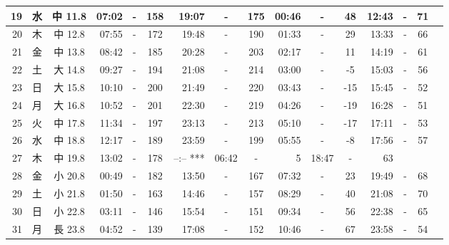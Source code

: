 \documentclass[12pt.a4j]{jsarticle}
\begin{document}
\begin{center}
\begin{table}[ht]
\begin{tabular}{|rc|cr|ccrccr|ccrccr|}
\hline
19 & 水 & 中 11.8 & 07:02 &-& 158 & 19:07 &-& 175 & 00:46 &-&  48 & 12:43 &-&  71 \\
\hline
20 & 木 & 中 12.8 & 07:55 &-& 172 & 19:48 &-& 190 & 01:33 &-&  29 & 13:33 &-&  66 \\
\hline
21 & 金 & 中 13.8 & 08:42 &-& 185 & 20:28 &-& 203 & 02:17 &-&  11 & 14:19 &-&  61 \\
\hline
22 & 土 & 大 14.8 & 09:27 &-& 194 & 21:08 &-& 214 & 03:00 &-&  -5 & 15:03 &-&  56 \\
\hline
23 & 日 & 大 15.8 & 10:10 &-& 200 & 21:49 &-& 220 & 03:43 &-& -15 & 15:45 &-&  52 \\
\hline
24 & 月 & 大 16.8 & 10:52 &-& 201 & 22:30 &-& 219 & 04:26 &-& -19 & 16:28 &-&  51 \\
\hline
25 & 火 & 中 17.8 & 11:34 &-& 197 & 23:13 &-& 213 & 05:10 &-& -17 & 17:11 &-&  53 \\
\hline
26 & 水 & 中 18.8 & 12:17 &-& 189 & 23:59 &-& 199 & 05:55 &-&  -8 & 17:56 &-&  57 \\
\hline
27 & 木 & 中 19.8 & 13:02 &-& 178 & --:--   *** & 06:42 &-&   5 & 18:47 &-&  63 \\
\hline
28 & 金 & 小 20.8 & 00:49 &-& 182 & 13:50 &-& 167 & 07:32 &-&  23 & 19:49 &-&  68 \\
\hline
29 & 土 & 小 21.8 & 01:50 &-& 163 & 14:46 &-& 157 & 08:29 &-&  40 & 21:08 &-&  70 \\
\hline
30 & 日 & 小 22.8 & 03:11 &-& 146 & 15:54 &-& 151 & 09:34 &-&  56 & 22:38 &-&  65 \\
\hline
31 & 月 & 長 23.8 & 04:52 &-& 139 & 17:08 &-& 152 & 10:46 &-&  67 & 23:58 &-&  54 \\
\hline
\end{tabular}
\end{table}
\newpage
\end{center}
\end{document}
